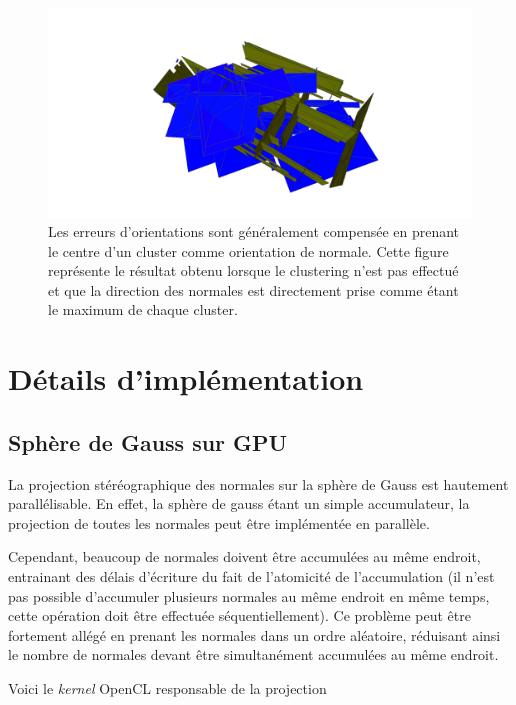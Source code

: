 \documentclass{article}
\begin{document}
\begin{figure}[H]
\centering
\includegraphics[width=\columnwidth]{../appart00.png}
\caption{Les erreurs d'orientations sont généralement compensée en prenant le centre d'un cluster comme orientation de normale. Cette figure représente le résultat obtenu lorsque le clustering n'est pas effectué et que la direction des normales est directement prise comme étant le maximum de chaque cluster.}
\end{figure}


\section{Détails d'implémentation}
\subsection{Sphère de Gauss sur GPU}
La projection stéréographique des normales sur la sphère de Gauss est hautement parallélisable. En effet, la sphère de gauss étant un simple accumulateur, la projection de toutes les normales peut être implémentée en parallèle. 

Cependant, beaucoup de normales doivent être accumulées au même endroit, entrainant des délais d'écriture du fait de l'atomicité de l'accumulation (il n'est pas possible d'accumuler plusieurs normales au même endroit en même temps, cette opération doit être effectuée séquentiellement). Ce problème peut être fortement allégé en prenant les normales dans un ordre aléatoire, réduisant ainsi le nombre de normales devant être simultanément accumulées au même endroit.

Voici le \emph{kernel} OpenCL responsable de la projection
\end{document}
